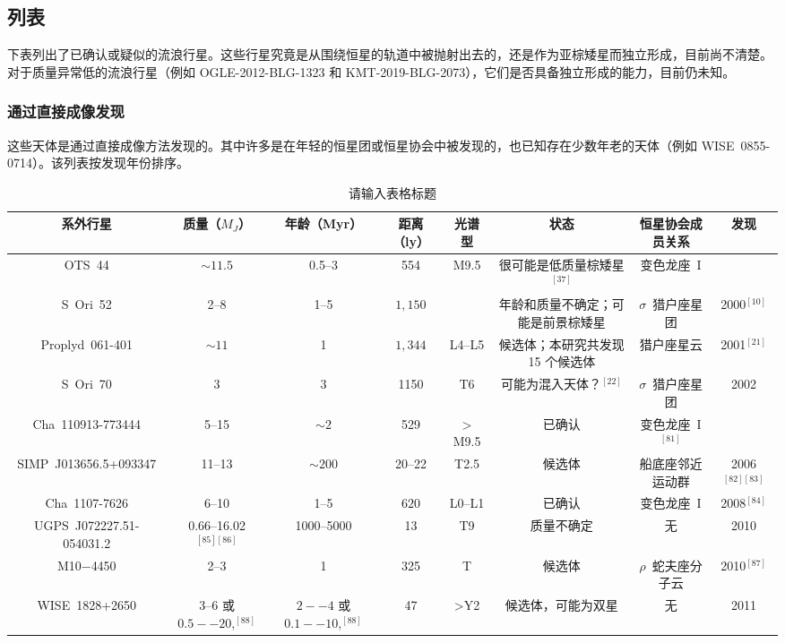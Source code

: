\subsection{列表}
下表列出了已确认或疑似的流浪行星。这些行星究竟是从围绕恒星的轨道中被抛射出去的，还是作为亚棕矮星而独立形成，目前尚不清楚。对于质量异常低的流浪行星（例如 OGLE-2012-BLG-1323 和 KMT-2019-BLG-2073），它们是否具备独立形成的能力，目前仍未知。
\subsubsection{通过直接成像发现}
这些天体是通过直接成像方法发现的。其中许多是在年轻的恒星团或恒星协会中被发现的，也已知存在少数年老的天体（例如 WISE~0855-0714）。该列表按发现年份排序。

\begin{table}[ht]
\centering
\caption{请输入表格标题}\label{tab_RoPl1}
\begin{tabular}{|c|c|c|c|c|c|c|c|}
\hline
系外行星 & 质量（$M_J$）& 年龄（Myr）& 距离（ly）& 光谱型 & 状态 & 恒星协会成员关系 & 发现\\
\hline
OTS~44 & $\sim11.5$ & 0.5--3 & 554 & M9.5 & 很可能是低质量棕矮星$^{[37]}$ & 变色龙座~I \quad 1998\\
\hline
S~Ori~52 & 2--8 & 1--5 & $1{,}150$  &  & 年龄和质量不确定；可能是前景棕矮星 & $\sigma$~猎户座星团 & 2000$^{[10]}$\\
\hline
Proplyd~061-401 & $\sim11$ & 1 & $1{,}344$ & L4--L5 & 候选体；本研究共发现 15 个候选体 & 猎户座星云 & 2001$^{[21]}$\\
\hline
S~Ori~70 & 3 & 3 & 1150 & T6 & 可能为混入天体？$^{[22]}$ & $\sigma$~猎户座星团 & 2002\\
\hline
Cha~110913-773444 & 5--15 & $\sim2$ & 529 & $>$M9.5 & 已确认 & 变色龙座~I \quad 2004$^{[81]}$\\
\hline
SIMP~J013656.5+093347 & 11--13 & $\sim200$ & 20--22 & T2.5 & 候选体 & 船底座邻近运动群 & 2006$^{[82][83]}$\\
\hline
Cha~1107-7626 & 6--10 & 1--5 & $620$ & L0--L1 & 已确认 & 变色龙座~I & 2008$^{[84]}$\\
\hline
UGPS~J072227.51-054031.2 & 0.66--16.02$^{[85][86]}$ & 1000--5000& 13 & T9 & 质量不确定 & 无 & 2010\\
\hline
M10$-$4450 & 2--3 & 1 & 325 & T & 候选体 & $\rho$~蛇夫座分子云 & 2010$^{[87]}$\\
\hline
WISE~1828+2650 & 3--6 或 $0.5--20$,$^{[88]}$ & $2--4$ 或 $0.1--10$,$^{[88]}$ & 47 & >Y2 & 候选体，可能为双星 & 无 & 2011\\

\end{tabular}
\end{table}
